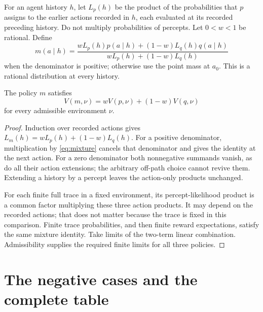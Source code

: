 \documentclass[11pt]{article}
\begin{document}
For an agent history $h$, let $L_p(h)$ be the product of the probabilities
that $p$ assigns to the earlier actions recorded in $h$, each evaluated
at its recorded preceding history. Do not multiply probabilities of
percepts. Let $0<w<1$ be rational. Define
\begin{equation}\label{eq:mixture}
 m(a\mid h)=
 \frac{wL_p(h)p(a\mid h)+(1-w)L_q(h)q(a\mid h)}
      {wL_p(h)+(1-w)L_q(h)}
\end{equation}
when the denominator is positive; otherwise use the point mass at $a_0$.
This is a rational distribution at every history.

\begin{lemma}\label{lem:mixture}
The policy $m$ satisfies
\[
 V(m,\nu)=wV(p,\nu)+(1-w)V(q,\nu)
\]
for every admissible environment $\nu$.
\end{lemma}
\begin{proof}
Induction over recorded actions gives
$L_m(h)=wL_p(h)+(1-w)L_q(h)$. For a positive denominator, multiplication
by \eqref{eq:mixture} cancels that denominator and gives the identity
at the next action. For a zero denominator both nonnegative summands
vanish, as do all their action extensions; the arbitrary off-path
choice cannot revive them. Extending a history by a percept leaves
the action-only products unchanged.

For each finite full trace in a fixed environment, its percept-likelihood
product is a common factor multiplying these three action products.
It may depend on the recorded actions; that does not matter because
the trace is fixed in this comparison. Finite trace probabilities,
and then finite reward expectations, satisfy the same mixture identity.
Take limits of the two-term linear combination. Admissibility supplies
the required finite limits for all three policies.
\end{proof}

\section{The negative cases and the complete table}
\end{document}

